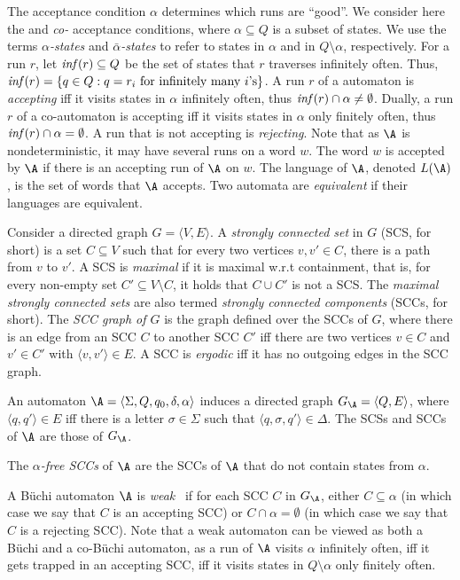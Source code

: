 \documentclass{lmcs}
\begin{document}
The acceptance condition $\alpha$ determines which runs are ``good''. We consider here the \emph{\buchi} and \emph{co-\buchi} acceptance conditions, where $\alpha \subseteq Q$ is a subset of states. We use the terms {\em $\alpha$-states\/} and  {\em $\bar{\alpha}$-states\/} to refer to states in $\alpha$ and in $Q \setminus \alpha$, respectively. For a run $r$, let ${\it inf}(r)\subseteq Q$ be the set of states that $r$ traverses infinitely often. Thus, 
${\it inf}(r) = \{  q \in Q: q = r_i \text{ for infinitely many $i$'s}   \}$. 
A run $r$ of a \buchi automaton is \emph{accepting} iff it visits states in $\alpha$ infinitely often, thus ${\it inf}(r)\cap \alpha \neq \emptyset$. Dually, a run $r$ of a co-\buchi automaton is accepting iff it visits states in $\alpha$ only finitely often, thus ${\it inf}(r)\cap \alpha = \emptyset$.
A run that is not accepting is \emph{rejecting}.  Note that as $\A$ is nondeterministic, it may have several runs on a word $w$. The word $w$ is accepted by $\A$ if there is an accepting run of $\A$ on $w$. The language of $\A$, denoted $L(\A)$, is the set of words that $\A$ accepts. Two automata are \emph{equivalent} if their languages are equivalent. 


Consider a directed graph $G = \langle V, E\rangle$. A \emph{strongly connected set\/} in $G$ (SCS, for short) is a set $C\subseteq V$ such that for every two vertices $v, v'\in C$, there is a path from $v$ to $v'$. A SCS is \emph{maximal} if it is maximal w.r.t containment, that is, for every non-empty set $C'\subseteq V\setminus C$, it holds that $C\cup C'$ is not a SCS. The \emph{maximal strongly connected sets} are also termed \emph{strongly connected components} (SCCs, for short). The \emph{SCC graph of $G$} is the graph defined over the SCCs of $G$, where there is an edge from an SCC $C$ to another SCC $C'$ iff there are two vertices $v\in C$ and $v'\in C'$ with $\langle v, v'\rangle\in E$. A SCC is \emph{ergodic} iff it has no outgoing edges in the SCC graph. 

An automaton $\A = \langle \Sigma, Q, q_0, \delta, \alpha\rangle$ induces a directed graph $G_{\A} = \langle Q, E \rangle$, where $\langle q, q'\rangle\in E$ iff there is a letter $\sigma \in \Sigma$ such that $\langle q, \sigma, q'\rangle \in \Delta$. The SCSs and SCCs of $\A$ are those of $G_{\A}$. 

The \emph{$\alpha$-free SCCs} of $\A$ are the SCCs of $\A$ that do not contain states from $\alpha$.



A B\"uchi automaton $\A$ is {\em weak}~\cite{MSS88} if for each SCC $C$ in $G_\A$, either $C\subseteq \alpha$ (in which case we say that $C$ is an accepting SCC) or $C \cap \alpha = \emptyset$ (in which case we say that $C$ is a rejecting SCC). Note that a weak automaton can be viewed as both a B\"uchi and a co-B\"uchi automaton, as a run of $\A$ visits $\alpha$ infinitely often, iff it gets trapped in an accepting SCC, iff
it visits states in $Q \setminus \alpha$ only finitely often.
\end{document}
